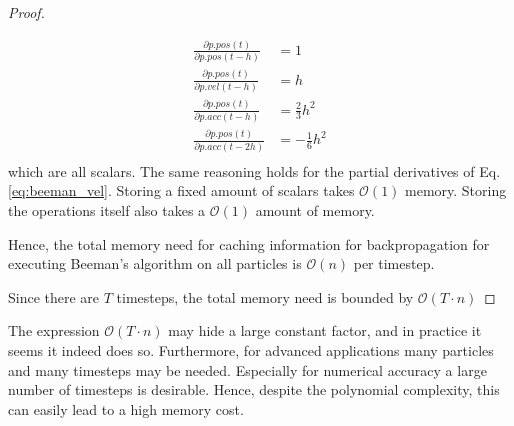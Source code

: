 \begin{proof}
\begin{enumerate}
    \begin{align}
        \frac{\partial p.pos(t)}{\partial p.pos(t-h)} & = 1 \\
        \frac{\partial p.pos(t)}{\partial p.vel(t-h)} & = h \\
        \frac{\partial p.pos(t)}{\partial p.acc(t-h)} & = \frac{2}{3}h^2 \\
        \frac{\partial p.pos(t)}{\partial p.acc(t-2h)} & = -\frac{1}{6}h^2 \\
    \end{align}
    which are all scalars. The same reasoning holds for the partial derivatives of Eq. \eqref{eq:beeman_vel}. Storing a fixed amount of scalars takes $\mathcal{O}(1)$ memory. Storing the operations itself also takes a $\mathcal{O}(1)$ amount of memory.
    
    Hence, the total memory need for caching information for backpropagation for executing Beeman's algorithm on all particles 
    is $\mathcal{O}(n)$ per timestep. 
\end{enumerate}
Since there are $T$ timesteps, the total memory need is bounded by $\mathcal{O}(T \cdot n)$
\end{proof}

The expression $\mathcal{O}(T \cdot n)$ may hide a large constant factor, 
and in practice it seems it indeed does so. 
Furthermore, for advanced applications many particles and many timesteps may be needed. 
Especially for numerical accuracy a large number of timesteps is desirable. 
Hence, despite the polynomial complexity, 
this can easily lead to a high memory cost.